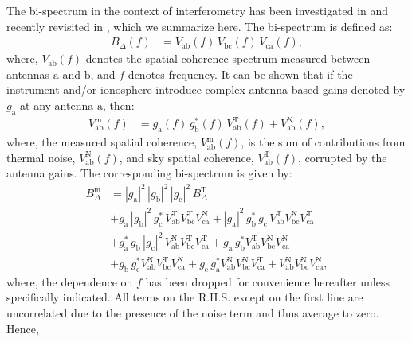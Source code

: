 \documentclass[
reprint,
superscriptaddress,
amsmath,
amssymb,
aps,
prd
]{revtex4-1}
\begin{document}
The bi-spectrum in the context of interferometry has been investigated in \cite{jen58,kul89,tay99,tho01} and recently revisited in \cite{car18}, which we summarize here. The bi-spectrum is defined as:
\begin{align}
  B_\Delta(f) &= V_\textrm{ab}(f)\,V_\textrm{bc}(f)\,V_\textrm{ca}(f),
\end{align}
where, $V_\textrm{ab}(f)$ denotes the spatial coherence spectrum measured between antennas $\textrm{a}$ and $\textrm{b}$, and $f$ denotes frequency. It can be shown that if the instrument and/or ionosphere introduce complex antenna-based gains denoted by $g_\textrm{a}$ at any antenna $\textrm{a}$, then: 
\begin{align}
  V_\textrm{ab}^\textrm{m}(f) &= g_\textrm{a}(f)\, g_\textrm{b}^*(f)\, V_\textrm{ab}^\textrm{T}(f) + V_\textrm{ab}^\textrm{N}(f),
\end{align}
where, the measured spatial coherence, $V_\textrm{ab}^\textrm{m}(f)$, is the sum of contributions from thermal noise, $V_\textrm{ab}^\textrm{N}(f)$, and sky spatial coherence, $V_\textrm{ab}^\textrm{T}(f)$, corrupted by the antenna gains. The corresponding bi-spectrum is given by:
\begin{align}\label{eqn:bispectrum-terms}
  B_\Delta^\textrm{m} &= |g_\textrm{a}|^2\, |g_\textrm{b}|^2\, |g_\textrm{c}|^2\, B_\Delta^\textrm{T} \\
  &+ g_\textrm{a}\,|g_\textrm{b}|^2\,g_\textrm{c}^*\,V_\textrm{ab}^\textrm{T}V_\textrm{bc}^\textrm{T}V_\textrm{ca}^\textrm{N} + |g_\textrm{a}|^2\,g_\textrm{b}^*\,g_\textrm{c}\,V_\textrm{ab}^\textrm{T}V_\textrm{bc}^\textrm{N}V_\textrm{ca}^\textrm{T} \nonumber \\
  &+ g_\textrm{a}^*\,g_\textrm{b}\,|g_\textrm{c}|^2\,V_\textrm{ab}^\textrm{N}V_\textrm{bc}^\textrm{T}V_\textrm{ca}^\textrm{T} + g_\textrm{a}\,g_\textrm{b}^*V_\textrm{ab}^\textrm{T}V_\textrm{bc}^\textrm{N}V_\textrm{ca}^\textrm{N} \nonumber \\
  &+ g_\textrm{b}\,g_\textrm{c}^*V_\textrm{ab}^\textrm{N}V_\textrm{bc}^\textrm{T}V_\textrm{ca}^\textrm{N} + g_\textrm{c}\,g_\textrm{a}^*V_\textrm{ab}^\textrm{N}V_\textrm{bc}^\textrm{N}V_\textrm{ca}^\textrm{T} + V_\textrm{ab}^\textrm{N}V_\textrm{bc}^\textrm{N}V_\textrm{ca}^\textrm{N}, \nonumber 
\end{align}
where, the dependence on $f$ has been dropped for convenience hereafter unless specifically indicated. All terms on the R.H.S. except on the first line are uncorrelated due to the presence of the noise term and thus average to zero. Hence, 
\end{document}
